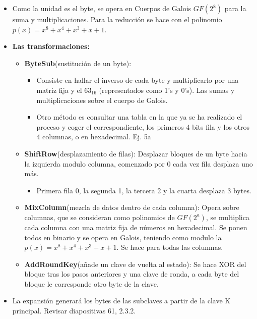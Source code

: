 \documentclass[12pt, twoside, openright]{report} %
\begin{document}
\begin{itemize}
\begin{itemize}
\begin{itemize}
		            \end{itemize}
		      \item Como la unidad es el byte, se opera en Cuerpos de Galois $GF(2^8)$ para la suma y multiplicaciones. Para la reducción se hace con el polinomio $p(x)=x^8+x^4+x^3+x+1$.
		      \item \textbf{Las transformaciones:}
		            \begin{itemize}
			            \item \textbf{ByteSub}(sustitución de un byte):
			                  \begin{itemize}
				                  \item Consiste en hallar el inverso de cada byte y multiplicarlo por una matriz fija y el $63_{16}$ (representados como 1's y 0's). Las sumas y multiplicaciones sobre el cuerpo de Galois.
				                  \item Otro método es consultar una tabla en la que ya se ha realizado el proceso y coger el correspondiente, los primeros 4 bits fila y los otros 4 columnas, o en hexadecimal. Ej. 5a
			                  \end{itemize}
			            \item \textbf{ShiftRow}(desplazamiento de filas): Desplazar bloques de un byte hacia la izquierda modulo columna, comenzado por 0 cada vez fila desplaza uno más.
			                  \begin{itemize}
				                  \item Primera fila 0, la segunda 1, la tercera 2 y la cuarta desplaza 3 bytes.
			                  \end{itemize}
			            \item \textbf{MixColumn}(mezcla de datos dentro de cada columna): Opera sobre columnas, que se consideran como polinomios de $GF(2^a)$, se multiplica cada columna con una matriz fija de números en hexadecimal. Se ponen todos en binario y se opera en Galois, teniendo como modulo la $p(x)=x^8+x^4+x^3+x+1$. Se hace para todas las columnas.
			            \item \textbf{AddRoundKey}(añade un clave de vuelta al estado): Se hace XOR del bloque tras los pasos anteriores y una clave de ronda, a cada byte del bloque le corresponde otro byte de la clave.
		            \end{itemize}
		      \item La expansión generará los bytes de las subclaves a partir de la clave K principal. Revisar diapositivas 61, 2.3.2.
	      \end{itemize}

\end{itemize}
\end{document}
